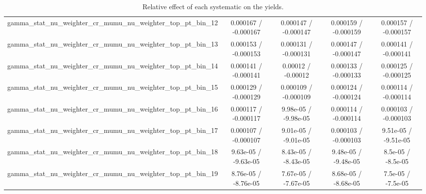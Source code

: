 \documentclass[10pt]{article}
\begin{document}
\begin{table}[htbp]
\begin{center}
\begin{tabular}{|c|c|c|c|c|}
  gamma_stat_nu_weighter_cr_mumu_nu_weighter_top_pt_bin_12 & 0.000167 / -0.000167 & 0.000147 / -0.000147 & 0.000159 / -0.000159 & 0.000157 / -0.000157 \\ 
  gamma_stat_nu_weighter_cr_mumu_nu_weighter_top_pt_bin_13 & 0.000153 / -0.000153 & 0.000131 / -0.000131 & 0.000147 / -0.000147 & 0.000141 / -0.000141 \\ 
  gamma_stat_nu_weighter_cr_mumu_nu_weighter_top_pt_bin_14 & 0.000141 / -0.000141 & 0.00012 / -0.00012 & 0.000133 / -0.000133 & 0.000125 / -0.000125 \\ 
  gamma_stat_nu_weighter_cr_mumu_nu_weighter_top_pt_bin_15 & 0.000129 / -0.000129 & 0.000109 / -0.000109 & 0.000124 / -0.000124 & 0.000114 / -0.000114 \\ 
  gamma_stat_nu_weighter_cr_mumu_nu_weighter_top_pt_bin_16 & 0.000117 / -0.000117 & 9.98e-05 / -9.98e-05 & 0.000114 / -0.000114 & 0.000103 / -0.000103 \\ 
  gamma_stat_nu_weighter_cr_mumu_nu_weighter_top_pt_bin_17 & 0.000107 / -0.000107 & 9.01e-05 / -9.01e-05 & 0.000103 / -0.000103 & 9.51e-05 / -9.51e-05 \\ 
  gamma_stat_nu_weighter_cr_mumu_nu_weighter_top_pt_bin_18 & 9.63e-05 / -9.63e-05 & 8.43e-05 / -8.43e-05 & 9.48e-05 / -9.48e-05 & 8.5e-05 / -8.5e-05 \\ 
  gamma_stat_nu_weighter_cr_mumu_nu_weighter_top_pt_bin_19 & 8.76e-05 / -8.76e-05 & 7.67e-05 / -7.67e-05 & 8.68e-05 / -8.68e-05 & 7.5e-05 / -7.5e-05 \\ 
\hline 
\end{tabular} 
\caption{Relative effect of each systematic on the yields.} 
\end{center} 
\end{table} 
\end{document}
